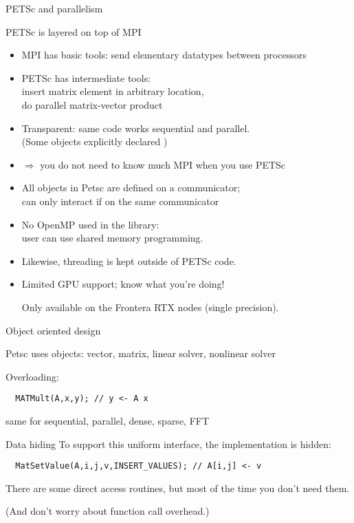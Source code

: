 \begin{numberedframe}{PETSc and parallelism}

PETSc is layered on top of MPI

\begin{itemize}
\item
MPI has basic tools: send elementary datatypes between processors
\item PETSc has intermediate tools:\\
insert matrix element in arbitrary location,\\
do parallel matrix-vector product
\item 
  Transparent: same code works sequential and parallel.\\
  (Some objects explicitly declared )
\item 
$\Rightarrow$ you do not need to know much MPI when you use PETSc
\item
All objects in Petsc are defined on a communicator;\\
can only interact if on the same communicator
\item
No OpenMP used in the library:\\
user can use shared memory programming.
\item
Likewise, threading is kept outside of PETSc code.
\item Limited \ac{GPU} support; know what you're doing!
\begin{taccnote}
Only available on the Frontera RTX nodes (single precision).
\end{taccnote}
\end{itemize}
\end{numberedframe}

\begin{numberedframe}{Object oriented design}

Petsc uses objects: vector, matrix, linear solver, nonlinear solver

Overloading: 
\begin{verbatim}
  MATMult(A,x,y); // y <- A x
\end{verbatim}
same for sequential, parallel, dense, sparse, FFT
\end{numberedframe}

\begin{numberedframe}{Data hiding}
To support this uniform interface, the implementation is hidden:
\begin{verbatim}
  MatSetValue(A,i,j,v,INSERT_VALUES); // A[i,j] <- v
\end{verbatim}
There are some direct access routines, but most of the time you don't
need them.

(And don't worry about function call overhead.)
\end{numberedframe}

